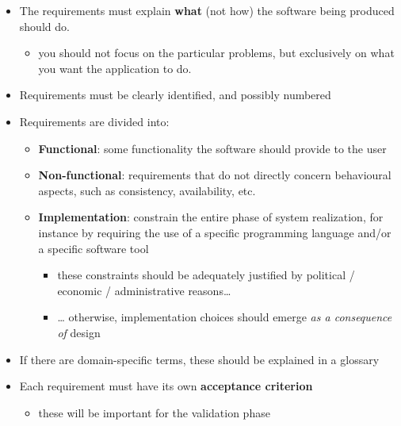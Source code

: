 \documentclass{scrartcl}
\newenvironment{guideline}[1][gray]{\color{#1}}{}
\begin{document}
\begin{guideline}
  \begin{itemize}
    \item The requirements must explain \textbf{what} (not how) the software
    being produced should do.
    \begin{itemize}
      \item you should not focus on the particular problems, but exclusively on
      what you want the application to do.
    \end{itemize}

    \item Requirements must be clearly identified, and possibly numbered

    \item Requirements are divided into:
    \begin{itemize}
      \item \textbf{Functional}: some functionality the software should provide to the user

      \item \textbf{Non-functional}: requirements that do not directly concern behavioural aspects, such as consistency, availability, etc.

      \item \textbf{Implementation}: constrain the entire phase of system realization, 
      for instance by requiring the use of a specific programming language and/or a specific software tool
      \begin{itemize}
        \item these constraints should be adequately justified by political / economic / administrative reasons\ldots{}
        \item \ldots{} otherwise, implementation choices should emerge \emph{as  a consequence of} design
      \end{itemize}
    \end{itemize}

    \item If there are domain-specific terms, these should be explained in a glossary
    
    \item Each requirement must have its own \textbf{acceptance criterion}
    \begin{itemize}
      \item these will be important for the validation phase
    \end{itemize}
  \end{itemize}
\end{guideline}
\end{document}
